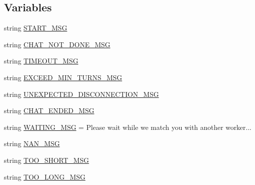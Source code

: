 \subsection*{Variables}
\begin{DoxyCompactItemize}
\item 
string \hyperlink{namespaceprojects_1_1wizard__of__wikipedia_1_1mturk__evaluation__task_1_1worlds_aeaa7f2d3fe99971bc349eae77529a1e1}{S\+T\+A\+R\+T\+\_\+\+M\+SG}
\item 
string \hyperlink{namespaceprojects_1_1wizard__of__wikipedia_1_1mturk__evaluation__task_1_1worlds_a5c012777798da74dcc76fe3f56d7add3}{C\+H\+A\+T\+\_\+\+N\+O\+T\+\_\+\+D\+O\+N\+E\+\_\+\+M\+SG}
\item 
string \hyperlink{namespaceprojects_1_1wizard__of__wikipedia_1_1mturk__evaluation__task_1_1worlds_a76bbbf9d2a8f67f0e0c0c963d004e098}{T\+I\+M\+E\+O\+U\+T\+\_\+\+M\+SG}
\item 
string \hyperlink{namespaceprojects_1_1wizard__of__wikipedia_1_1mturk__evaluation__task_1_1worlds_a922d8e8cf154deab2f29a646267dc98e}{E\+X\+C\+E\+E\+D\+\_\+\+M\+I\+N\+\_\+\+T\+U\+R\+N\+S\+\_\+\+M\+SG}
\item 
string \hyperlink{namespaceprojects_1_1wizard__of__wikipedia_1_1mturk__evaluation__task_1_1worlds_a8eff26bf658d8e390b102a9858a9e8b6}{U\+N\+E\+X\+P\+E\+C\+T\+E\+D\+\_\+\+D\+I\+S\+C\+O\+N\+N\+E\+C\+T\+I\+O\+N\+\_\+\+M\+SG}
\item 
string \hyperlink{namespaceprojects_1_1wizard__of__wikipedia_1_1mturk__evaluation__task_1_1worlds_a8fb3c230e5337cc92a1b501b014c1de4}{C\+H\+A\+T\+\_\+\+E\+N\+D\+E\+D\+\_\+\+M\+SG}
\item 
string \hyperlink{namespaceprojects_1_1wizard__of__wikipedia_1_1mturk__evaluation__task_1_1worlds_a109ecb7db563e23a03f5a213fd96e849}{W\+A\+I\+T\+I\+N\+G\+\_\+\+M\+SG} = \textquotesingle{}Please wait while we match you with another worker...\textquotesingle{}
\item 
string \hyperlink{namespaceprojects_1_1wizard__of__wikipedia_1_1mturk__evaluation__task_1_1worlds_a044f9985e001f2473cd4fbe0c7482abe}{N\+A\+N\+\_\+\+M\+SG}
\item 
string \hyperlink{namespaceprojects_1_1wizard__of__wikipedia_1_1mturk__evaluation__task_1_1worlds_a1a3d116fb9bcb3a1b100277ff924df77}{T\+O\+O\+\_\+\+S\+H\+O\+R\+T\+\_\+\+M\+SG}
\item 
string \hyperlink{namespaceprojects_1_1wizard__of__wikipedia_1_1mturk__evaluation__task_1_1worlds_a6bb410d42201fe4142ac3ce1486dc62c}{T\+O\+O\+\_\+\+L\+O\+N\+G\+\_\+\+M\+SG}

\end{DoxyCompactItemize}
